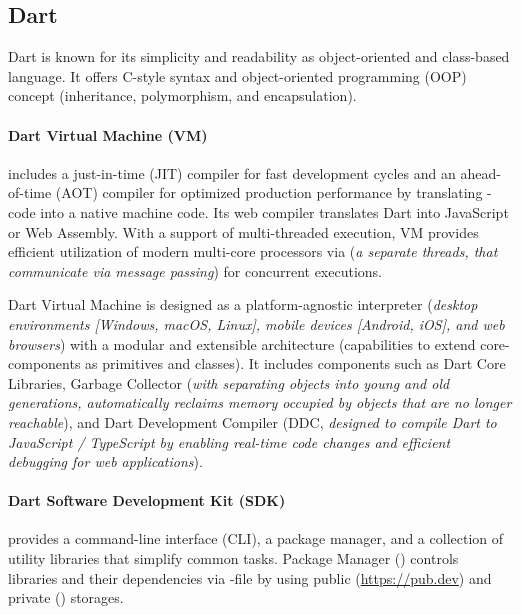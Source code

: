 
\subsection{Dart}
 \label{dart}

Dart is known for its simplicity and readability as object-oriented and class-based language. It offers C-style syntax 
and object-oriented programming (OOP) concept (inheritance, polymorphism, and encapsulation).

\paragraph{Dart Virtual Machine (VM)} includes a just-in-time (JIT) compiler for fast development cycles and an 
ahead-of-time (AOT) compiler for optimized production performance by translating -code into a native machine 
code. Its web compiler translates Dart into JavaScript or Web Assembly. With a support of multi-threaded 
execution, VM provides efficient utilization of modern multi-core processors via  (\emph{a separate threads, 
that communicate via message passing}) for concurrent executions.

Dart Virtual Machine is designed as a platform-agnostic interpreter (\emph{desktop environments [Windows, macOS, Linux], 
mobile devices [Android, iOS], and web browsers}) with a modular and extensible architecture (capabilities to extend 
core-components as primitives and classes). It includes components such as Dart Core Libraries, Garbage Collector 
(\emph{with separating objects into young and old generations, automatically reclaims memory occupied by objects that 
are no longer reachable}), and Dart Development Compiler (DDC, \emph{designed to compile Dart to JavaScript / TypeScript 
by enabling real-time code changes and efficient debugging for web applications}).

\paragraph{Dart Software Development Kit (SDK)} provides a command-line interface (CLI), a package manager, 
and a collection of utility libraries that simplify common tasks. Package Manager () controls libraries and 
their dependencies via -file by using public (\href{https://pub.dev}{https://pub.dev}) and private 
() storages.

